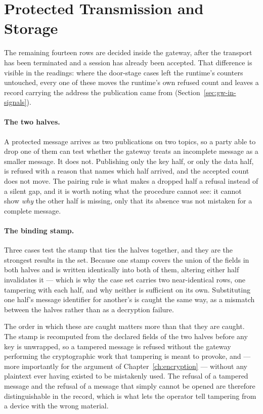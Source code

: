 \documentclass[12pt,a4paper]{report}
\begin{document}
\section{Protected Transmission and Storage}
\label{sec:eval-protection}

The remaining fourteen rows are decided inside the gateway,
after the transport has been terminated and a session has
already been accepted. That difference is visible in the
readings: where the door-stage cases left the runtime's
counters untouched, every one of these moves the runtime's
own refused count and leaves a record carrying the address
the publication came from (Section~\ref{sec:gw-in-signals}).

\paragraph{The two halves.}
A protected message arrives as two publications on two
topics, so a party able to drop one of them can test whether
the gateway treats an incomplete message as a smaller
message. It does not. Publishing only the key half, or only
the data half, is refused with a reason that names which
half arrived, and the accepted count does not move. The
pairing rule is what makes a dropped half a refusal instead
of a silent gap, and it is worth noting what the procedure
cannot see: it cannot show \emph{why} the other half is
missing, only that its absence was not mistaken for a
complete message.

\paragraph{The binding stamp.}
Three cases test the stamp that ties the halves together,
and they are the strongest results in the set. Because one
stamp covers the union of the fields in both halves and is
written identically into both of them, altering either half
invalidates it --- which is why the case set carries two
near-identical rows, one tampering with each half, and why
neither is sufficient on its own. Substituting one half's
message identifier for another's is caught the same way, as
a mismatch between the halves rather than as a decryption
failure.

The order in which these are caught matters more than that
they are caught. The stamp is recomputed from the declared
fields of the two halves before any key is unwrapped, so a
tampered message is refused without the gateway performing
the cryptographic work that tampering is meant to provoke,
and --- more importantly for the argument of
Chapter~\ref{ch:encryption} --- without any plaintext ever
having existed to be mistakenly used. The refusal of a
tampered message and the refusal of a message that simply
cannot be opened are therefore distinguishable in the
record, which is what lets the operator tell tampering from
a device with the wrong material.
\end{document}
